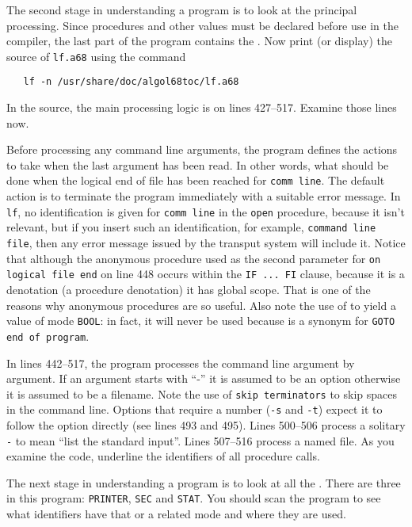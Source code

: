 The second stage in understanding a program is to look at the
principal processing. Since procedures and other values must be
declared before use in the  compiler,
the last part of the program contains the .
Now print (or display) the source of \verb|lf.a68| using the command
\begin{verbatim}
   lf -n /usr/share/doc/algol68toc/lf.a68
\end{verbatim}
\noindent
In the source, the main processing logic is on lines 427--517.
Examine those lines now.

Before processing any command line arguments, the program defines the
actions to take when the last argument has been read. In other words,
what should be done when the logical end of file has been reached for
\verb|comm line|. The default action is to terminate the program
immediately with a suitable error message. In \verb|lf|, no
identification is given for \verb|comm line| in the \verb|open|
procedure, because it isn't relevant, but if you insert such an
identification, for example, \verb|command line file|, then any error
message issued by the transput system will include it. Notice that
although the anonymous procedure used as the second parameter for
\verb|on logical file end| on line 448 occurs within the
\verb|IF ... FI| clause, because it is a denotation (a procedure
denotation) it has global scope. That is one of the reasons why
anonymous procedures are so useful. Also note the use of  to
yield a value of mode \verb|BOOL|: in fact, it will never be used
because  is a synonym for \verb|GOTO end of program|.

In lines 442--517, the program processes the command line argument by
argument. If an argument starts with ``-'' it is assumed to be an
option otherwise it is assumed to be a filename. Note the use of
\verb|skip terminators| to skip spaces in the command line.  Options
that require a number (\verb|-s| and \verb|-t|) expect it to follow
the option directly (see lines 493 and 495). Lines 500--506 process a
solitary \verb|-| to mean ``list the standard input''. Lines 507--516
process a named file. As you examine the code, underline the
identifiers of all procedure calls.

The next stage in understanding a program is to look at all the
.  There are three in this program:
\verb|PRINTER|, \verb|SEC| and \verb|STAT|.  You should scan the
program to see what identifiers have that or a related mode and where
they are used.

